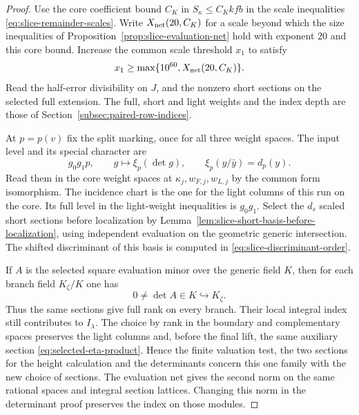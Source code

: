 \begin{proof}
Use the core coefficient bound \(C_K\) in \(S_\kappa\le C_K kfb\)
in the scale inequalities \eqref{eq:slice-remainder-scales}.
Write \(X_{\rm net}(20,C_K)\) for a scale beyond which the size
inequalities of Proposition~\ref{prop:slice-evaluation-net} hold
with exponent \(20\) and this core bound. Increase the common
scale threshold \(x_1\) to satisfy
\[
 x_1\ge\max\{10^{60},X_{\rm net}(20,C_K)\}.
\]
Read the half-error divisibility on \(J\), and the nonzero short
sections on the selected full extension. The full, short and
light weights and the index depth are those of
Section~\ref{subsec:paired-row-indices}.

At \(p=p(v)\) fix the split marking, once for all three weight spaces. The input level and its special character are
\[
 g_0g_1p,\qquad g\longmapsto\xi_p(\det g),\qquad \xi_p(y/\bar y)=d_p(y).
\] Read them in the core weight spaces at
\(\kappa_j,w_{F,j},w_{L,j}\) by the common form isomorphism.
The incidence chart is the one for the light columns of this
run on the core. Its full level in the light-weight inequalities
is \(g_0g_1\). Select the \(d_s\) scaled short sections before localization by
Lemma~\ref{lem:slice-short-basis-before-localization}, using independent
evaluation on the geometric generic intersection. The shifted
discriminant of this basis is computed in \eqref{eq:slice-discriminant-order}.

If \(A\) is the selected square evaluation minor over the generic
field \(K\), then for each branch field \(K_\zeta/K\) one has
\[
                    0\ne\det A\in K\hookrightarrow K_\zeta .
\]
Thus the same sections give full rank on every branch. Their local
integral index still contributes to \(I_\lambda\). The choice by rank in the
boundary and complementary spaces preserves the light columns
and, before the final lift, the same auxiliary section
\eqref{eq:selected-eta-product}. Hence the finite valuation
test, the two sections for the height calculation and the
determinants concern this one family with the new choice of sections. The evaluation
net gives the second norm on the same rational spaces and
integral section lattices. Changing this norm in the
determinant proof preserves the index on those modules.



\end{proof}
